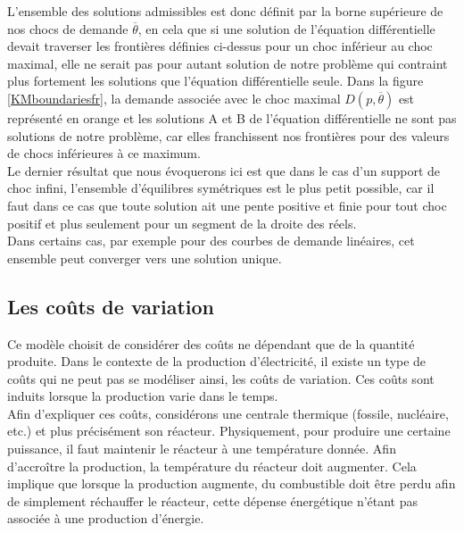 L'ensemble des solutions admissibles est donc définit par la borne supérieure de nos chocs de demande $\overline{\theta}$, en cela que si une solution de l'équation différentielle devait traverser les frontières définies ci-dessus pour un choc inférieur au choc maximal, elle ne serait pas pour autant solution de notre problème qui contraint plus fortement les solutions que l'équation différentielle seule. Dans la figure \ref{KMboundariesfr}, la demande associée avec le choc maximal $D(p,\overline{\theta})$ est représenté en orange et les solutions A et B de l'équation différentielle ne sont pas solutions de notre problème, car elles franchissent nos frontières pour des valeurs de chocs inférieures à ce maximum.\\

Le dernier résultat que nous évoquerons ici est que dans le cas d'un support de choc infini, l'ensemble d'équilibres symétriques est le plus petit possible, car il faut dans ce cas que toute solution ait une pente positive et finie pour tout choc positif et plus seulement pour un segment de la droite des réels.\\

Dans certains cas, par exemple pour des courbes de demande linéaires, cet ensemble peut converger vers une solution unique.\\

\subsection*{Les coûts de variation}

Ce modèle choisit de considérer des coûts ne dépendant que de la quantité produite. Dans le contexte de la production d'électricité, il existe un type de coûts qui ne peut pas se modéliser ainsi, les coûts de variation. Ces coûts sont induits lorsque la production varie dans le temps.\\

Afin d'expliquer ces coûts, considérons une centrale thermique (fossile, nucléaire, etc.) et plus précisément son réacteur. Physiquement, pour produire une certaine puissance, il faut maintenir le réacteur à une température donnée. Afin d'accroître la production, la température du réacteur doit augmenter. Cela implique que lorsque la production augmente, du combustible doit être perdu afin de simplement réchauffer le réacteur, cette dépense énergétique n'étant pas associée à une production d'énergie. \\

